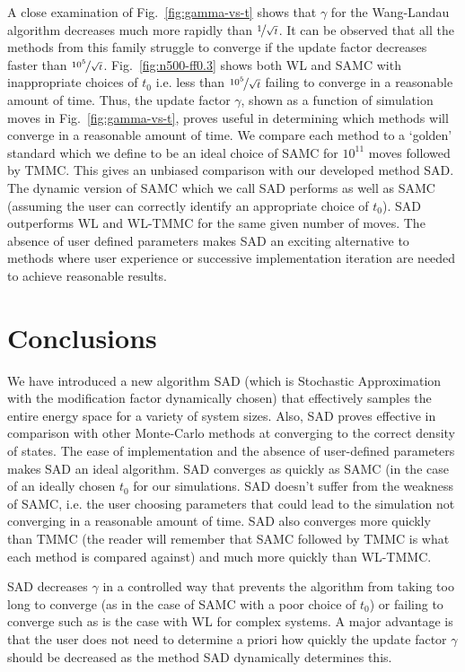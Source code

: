 \documentclass[letterpaper,twocolumn,amsmath,amssymb,pre,aps,10pt]{revtex4-1}
\begin{document}
A close examination of Fig.~\ref{fig:gamma-vs-t} shows that $\gamma$
for the Wang-Landau algorithm decreases much more rapidly than
$\nicefrac{1}{\sqrt{t}}$. It can be observed that all the methods from
this family struggle to converge if the update factor decreases faster
than $\nicefrac{10^5}{\sqrt{t}}$. Fig.~\ref{fig:n500-ff0.3} shows both
WL and SAMC with inappropriate choices of $t_0$ i.e. less than
$\nicefrac{10^5}{\sqrt{t}}$ failing to converge in a reasonable amount
of time. Thus, the update factor $\gamma$, shown as a function of
simulation moves in Fig.~\ref{fig:gamma-vs-t}, proves useful in
determining which methods will converge in a reasonable amount of time.
We compare each method to a `golden' standard which we define to be an
ideal choice of SAMC for $10^{11}$ moves followed by TMMC.  This gives an
unbiased comparison with our developed method SAD. The dynamic version
of SAMC which we call SAD performs as well as SAMC (assuming the user
can correctly identify an appropriate choice of $t_0$).  SAD
outperforms WL and WL-TMMC for the same given number of moves. The
absence of user defined parameters makes SAD an exciting alternative to
methods where user experience or successive implementation iteration
are needed to achieve reasonable results.

\section{Conclusions}

We have introduced a new algorithm SAD (which is Stochastic Approximation
with the modification factor dynamically chosen) that effectively
samples the entire energy space for a variety of system sizes.  Also,
SAD proves effective in comparison with other Monte-Carlo methods at
converging to the correct density of states.  The ease of
implementation and the absence of user-defined parameters makes SAD an
ideal algorithm. SAD converges as quickly as SAMC (in the case of an ideally
chosen $t_0$ for our simulations. SAD doesn't suffer from the weakness of SAMC,
i.e. the user choosing parameters that could lead to the simulation not
converging in a reasonable amount of time. SAD also converges more quickly
than TMMC (the reader will remember that SAMC followed by TMMC is what each
method is compared against) and much more quickly than WL-TMMC.

SAD decreases $\gamma$ in a controlled way that prevents the algorithm
from taking too long to converge (as in the case of SAMC with a poor choice
of $t_0$) or failing to converge such as is the case with WL for complex
systems. A major advantage is that the user does not need to determine a
priori how quickly the update factor $\gamma$ should be decreased as the
method SAD dynamically determines this.
\end{document}
